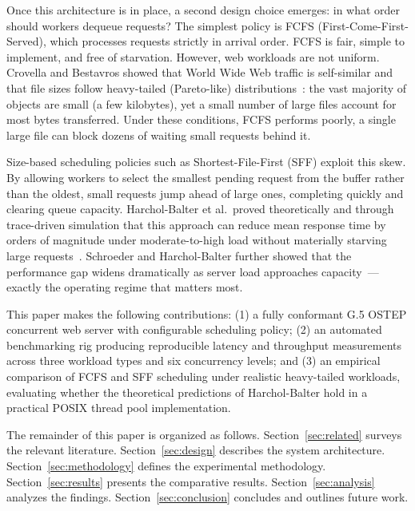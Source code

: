 \documentclass[conference]{IEEEtran}
\begin{document}
Once this architecture is in place, a second design choice emerges: in what
order should workers dequeue requests? The simplest policy is FCFS
(First-Come-First-Served), which processes requests strictly in arrival order.
FCFS is fair, simple to implement, and free of starvation. However, web
workloads are not uniform. Crovella and Bestavros showed that World Wide Web
traffic is self-similar and that file sizes follow heavy-tailed (Pareto-like)
distributions~\cite{crovella1997}: the vast majority of objects are small
(a few kilobytes), yet a small number of large files account for most bytes
transferred. Under these conditions, FCFS performs poorly, a single large
file can block dozens of waiting small requests behind it.

Size-based scheduling policies such as Shortest-File-First (SFF) exploit this
skew. By allowing workers to select the smallest pending request from the
buffer rather than the oldest, small requests jump ahead of large ones,
completing quickly and clearing queue capacity. Harchol-Balter et al.\
proved theoretically and through trace-driven simulation that this approach
can reduce mean response time by orders of magnitude under moderate-to-high
load without materially starving large requests~\cite{harchol2003}. Schroeder
and Harchol-Balter further showed that the performance gap widens dramatically
as server load approaches capacity~\cite{schroeder2006}---exactly the operating
regime that matters most.

This paper makes the following contributions: (1) a fully conformant G.5
OSTEP concurrent web server with configurable scheduling policy; (2) an
automated benchmarking rig producing reproducible latency and throughput
measurements across three workload types and six concurrency levels; and
(3) an empirical comparison of FCFS and SFF scheduling under realistic
heavy-tailed workloads, evaluating whether the theoretical predictions of
Harchol-Balter hold in a practical POSIX thread pool implementation.

The remainder of this paper is organized as follows.
Section~\ref{sec:related} surveys the relevant literature.
Section~\ref{sec:design} describes the system architecture.
Section~\ref{sec:methodology} defines the experimental methodology.
Section~\ref{sec:results} presents the comparative results.
Section~\ref{sec:analysis} analyzes the findings.
Section~\ref{sec:conclusion} concludes and outlines future work.

\end{document}
